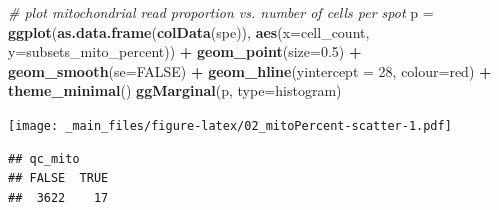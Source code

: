 \documentclass[
]{book}
\newenvironment{Shaded}{\begin{snugshade}}{\end{snugshade}}
\newcommand{\AttributeTok}[1]{\textcolor[rgb]{0.13,0.29,0.53}{#1}}
\newcommand{\CommentTok}[1]{\textcolor[rgb]{0.56,0.35,0.01}{\textit{#1}}}
\newcommand{\ConstantTok}[1]{\textcolor[rgb]{0.56,0.35,0.01}{#1}}
\newcommand{\DecValTok}[1]{\textcolor[rgb]{0.00,0.00,0.81}{#1}}
\newcommand{\DocumentationTok}[1]{\textcolor[rgb]{0.56,0.35,0.01}{\textbf{\textit{#1}}}}
\newcommand{\FloatTok}[1]{\textcolor[rgb]{0.00,0.00,0.81}{#1}}
\newcommand{\FunctionTok}[1]{\textcolor[rgb]{0.13,0.29,0.53}{\textbf{#1}}}
\newcommand{\NormalTok}[1]{#1}
\newcommand{\OtherTok}[1]{\textcolor[rgb]{0.56,0.35,0.01}{#1}}
\newcommand{\SpecialCharTok}[1]{\textcolor[rgb]{0.81,0.36,0.00}{\textbf{#1}}}
\newcommand{\StringTok}[1]{\textcolor[rgb]{0.31,0.60,0.02}{#1}}
\begin{document}
\begin{Shaded}
\begin{Highlighting}[]
\CommentTok{\# plot mitochondrial read proportion vs. number of cells per spot}
\NormalTok{p }\OtherTok{=} \FunctionTok{ggplot}\NormalTok{(}\FunctionTok{as.data.frame}\NormalTok{(}\FunctionTok{colData}\NormalTok{(spe)), }\FunctionTok{aes}\NormalTok{(}\AttributeTok{x=}\NormalTok{cell\_count, }\AttributeTok{y=}\NormalTok{subsets\_mito\_percent)) }\SpecialCharTok{+}
  \FunctionTok{geom\_point}\NormalTok{(}\AttributeTok{size=}\FloatTok{0.5}\NormalTok{) }\SpecialCharTok{+} 
  \FunctionTok{geom\_smooth}\NormalTok{(}\AttributeTok{se=}\ConstantTok{FALSE}\NormalTok{) }\SpecialCharTok{+}
  \FunctionTok{geom\_hline}\NormalTok{(}\AttributeTok{yintercept =} \DecValTok{28}\NormalTok{, }\AttributeTok{colour=}\StringTok{\textquotesingle{}red\textquotesingle{}}\NormalTok{) }\SpecialCharTok{+} 
  \FunctionTok{theme\_minimal}\NormalTok{()}
\FunctionTok{ggMarginal}\NormalTok{(p, }\AttributeTok{type=}\StringTok{\textquotesingle{}histogram\textquotesingle{}}\NormalTok{)}
\end{Highlighting}
\end{Shaded}

\texttt{[image: \_main\_files/figure-latex/02\_mitoPercent-scatter-1.pdf]}

\begin{Shaded}
\end{Shaded}

\begin{verbatim}
## qc_mito
## FALSE  TRUE 
##  3622    17
\end{verbatim}

\begin{Shaded}
\end{Shaded}
\end{document}
